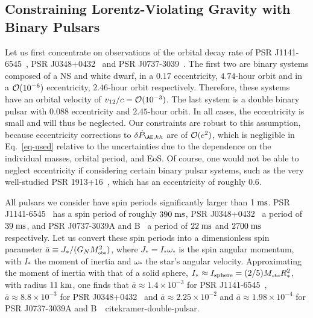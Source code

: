 \documentclass[prd,aps,twocolumn,nofootinbib,showpacs,superscriptaddress]{revtex4-1}
\newcommand{\obs}{{\mbox{\tiny obs}}}
\begin{document}
\subsection{Constraining Lorentz-Violating Gravity with Binary Pulsars}
\label{alpha-hat-sec}

Let us first concentrate on observations of the orbital decay rate of PSR J1141-6545~\cite{bhat}, PSR J0348+0432~\cite{2.01NS} and PSR J0737-3039~\cite{kramer-double-pulsar}. The first two are binary systems composed of a NS and white dwarf, in a $0.17$ eccentricity, $4.74$-hour orbit and in a ${\cal O}(10^{-6})$ eccentricity, $2.46$-hour orbit respectively. Therefore, these systems have an orbital velocity of $v_{12}/c = {\cal{O}}(10^{-3})$. The last system is a double binary pulsar with $0.088$ eccentricity and $2.45$-hour orbit. In all cases, the eccentricity is small and will thus be neglected. 
Our constraints are robust to this assumption, because eccentricity corrections to $\delta \dot{P}_{\AE,kh}$ are of ${\cal{O}}(e^{2})$, which is negligible in Eq.~\eqref{eq-used} relative to the uncertainties due to the dependence on the individual masses, orbital period, and EoS. Of course, one would not be able to neglect eccentricity if considering certain binary pulsar systems, such as the very well-studied PSR 1913+16~\cite{Hulse:1974eb,Taylor:1982zz,Taylor:1989sw}, which has an eccentricity of roughly $0.6$.

All pulsars we consider have spin periods significantly larger than $1 \; {\rm{ms}}$. PSR J1141-6545~\cite{bhat} has a spin period of roughly $390 \; {\rm{ms}}$, PSR J0348+0432~\cite{2.01NS} a period of $39 \; {\rm{ms}}$, and PSR J0737-3039A and B~\cite{kramer-double-pulsar} a period of $22 \; {\rm{ms}}$ and $2700 \; {\rm{ms}}$ respectively. Let us convert these spin periods into a dimensionless spin parameter $\bar{a} \equiv J_{*}/(G_N M_{\obs}^{2})$, where $J_{*} = I_{*} \omega_{*}$ is the spin angular momentum, with $I_{*}$ the moment of inertia and $\omega_{*}$ the star's angular velocity. Approximating the moment of inertia with that of a solid sphere, $I_{*} \approx I_{\rm{sphere}} = (2/5) M_{\obs} R_*^{2}$, with radius $11 \; {\rm{km}}$, one finds that $\bar{a} \approx 1.4 \times 10^{-3}$ for PSR J1141-6545~\cite{bhat}, $\bar{a} \approx 8.8 \times 10^{-3}$ for PSR J0348+0432~\cite{2.01NS} and $\bar{a} \approx 2.25 \times 10^{-2}$ and $\bar{a} \approx 1.98 \times 10^{-4}$ for PSR J0737-3039A and B~\
cite{kramer-double-pulsar}. 
\end{document}
